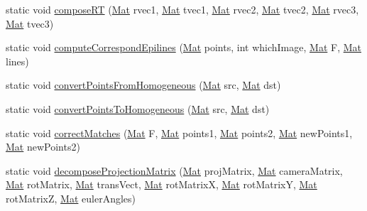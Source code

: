 \begin{DoxyCompactItemize}
\item 
static void \mbox{\hyperlink{classorg_1_1opencv_1_1calib3d_1_1_calib3d_a0549bb2dcba12e0f5c504d6a6871f3a6}{compose\+RT}} (\mbox{\hyperlink{classorg_1_1opencv_1_1core_1_1_mat}{Mat}} rvec1, \mbox{\hyperlink{classorg_1_1opencv_1_1core_1_1_mat}{Mat}} tvec1, \mbox{\hyperlink{classorg_1_1opencv_1_1core_1_1_mat}{Mat}} rvec2, \mbox{\hyperlink{classorg_1_1opencv_1_1core_1_1_mat}{Mat}} tvec2, \mbox{\hyperlink{classorg_1_1opencv_1_1core_1_1_mat}{Mat}} rvec3, \mbox{\hyperlink{classorg_1_1opencv_1_1core_1_1_mat}{Mat}} tvec3)
\item 
static void \mbox{\hyperlink{classorg_1_1opencv_1_1calib3d_1_1_calib3d_a5a2813b406a15a54fdb5b3ba8f9e74c6}{compute\+Correspond\+Epilines}} (\mbox{\hyperlink{classorg_1_1opencv_1_1core_1_1_mat}{Mat}} points, int which\+Image, \mbox{\hyperlink{classorg_1_1opencv_1_1core_1_1_mat}{Mat}} F, \mbox{\hyperlink{classorg_1_1opencv_1_1core_1_1_mat}{Mat}} lines)
\item 
static void \mbox{\hyperlink{classorg_1_1opencv_1_1calib3d_1_1_calib3d_aea48eb14657d4f20ebdf415b265c9a9b}{convert\+Points\+From\+Homogeneous}} (\mbox{\hyperlink{classorg_1_1opencv_1_1core_1_1_mat}{Mat}} src, \mbox{\hyperlink{classorg_1_1opencv_1_1core_1_1_mat}{Mat}} dst)
\item 
static void \mbox{\hyperlink{classorg_1_1opencv_1_1calib3d_1_1_calib3d_a718a2c8745024b449e6d2435937cae4f}{convert\+Points\+To\+Homogeneous}} (\mbox{\hyperlink{classorg_1_1opencv_1_1core_1_1_mat}{Mat}} src, \mbox{\hyperlink{classorg_1_1opencv_1_1core_1_1_mat}{Mat}} dst)
\item 
static void \mbox{\hyperlink{classorg_1_1opencv_1_1calib3d_1_1_calib3d_a1f9be07026d6dec97548b38d2e46199e}{correct\+Matches}} (\mbox{\hyperlink{classorg_1_1opencv_1_1core_1_1_mat}{Mat}} F, \mbox{\hyperlink{classorg_1_1opencv_1_1core_1_1_mat}{Mat}} points1, \mbox{\hyperlink{classorg_1_1opencv_1_1core_1_1_mat}{Mat}} points2, \mbox{\hyperlink{classorg_1_1opencv_1_1core_1_1_mat}{Mat}} new\+Points1, \mbox{\hyperlink{classorg_1_1opencv_1_1core_1_1_mat}{Mat}} new\+Points2)
\item 
static void \mbox{\hyperlink{classorg_1_1opencv_1_1calib3d_1_1_calib3d_a7ee2a1b10202fdb49551a6282323f4de}{decompose\+Projection\+Matrix}} (\mbox{\hyperlink{classorg_1_1opencv_1_1core_1_1_mat}{Mat}} proj\+Matrix, \mbox{\hyperlink{classorg_1_1opencv_1_1core_1_1_mat}{Mat}} camera\+Matrix, \mbox{\hyperlink{classorg_1_1opencv_1_1core_1_1_mat}{Mat}} rot\+Matrix, \mbox{\hyperlink{classorg_1_1opencv_1_1core_1_1_mat}{Mat}} trans\+Vect, \mbox{\hyperlink{classorg_1_1opencv_1_1core_1_1_mat}{Mat}} rot\+MatrixX, \mbox{\hyperlink{classorg_1_1opencv_1_1core_1_1_mat}{Mat}} rot\+MatrixY, \mbox{\hyperlink{classorg_1_1opencv_1_1core_1_1_mat}{Mat}} rot\+MatrixZ, \mbox{\hyperlink{classorg_1_1opencv_1_1core_1_1_mat}{Mat}} euler\+Angles)

\end{DoxyCompactItemize}
